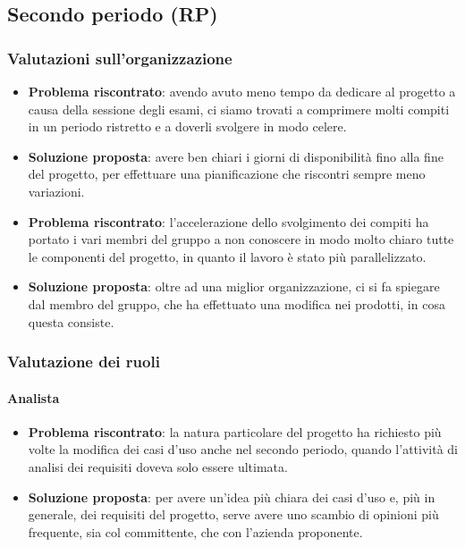     \subsection{Secondo periodo (RP)}\label{valutazioni per il miglioramento:RP}

    \subsubsection{Valutazioni sull'organizzazione}
        \begin{itemize}
            \item \textbf{Problema riscontrato}: avendo avuto meno tempo da dedicare al progetto a causa della sessione degli esami, ci siamo trovati a comprimere molti compiti in un periodo ristretto e a doverli svolgere in modo celere.
            \item \textbf{Soluzione proposta}: avere ben chiari i giorni di disponibilità fino alla fine del progetto, per effettuare una pianificazione che riscontri sempre meno variazioni.
            \item \textbf{Problema riscontrato}: l'accelerazione dello svolgimento dei compiti ha portato i vari membri del gruppo a non conoscere in modo molto chiaro tutte le componenti del progetto, in quanto il lavoro è stato più parallelizzato.
            \item \textbf{Soluzione proposta}: oltre ad una miglior organizzazione, ci si fa spiegare dal membro del gruppo, che ha effettuato una modifica nei prodotti, in cosa questa consiste.
        \end{itemize}

    \subsubsection{Valutazione dei ruoli}

        \paragraph{Analista}
            \begin{itemize}
                \item \textbf{Problema riscontrato}: la natura particolare del progetto ha richiesto più volte la modifica dei casi d'uso anche nel secondo periodo, quando l'attività di analisi dei requisiti doveva solo essere ultimata.
                \item \textbf{Soluzione proposta}: per avere un'idea più chiara dei casi d'uso e, più in generale, dei requisiti del progetto, serve avere uno scambio di opinioni più frequente, sia col committente, che con l'azienda proponente.
            \end{itemize}

